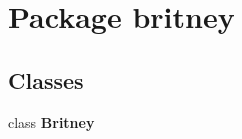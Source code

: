 \section{Package britney}
\label{namespacebritney}


\subsection*{Classes}
\begin{CompactItemize}
\item 
class {\bf Britney}
\end{CompactItemize}
